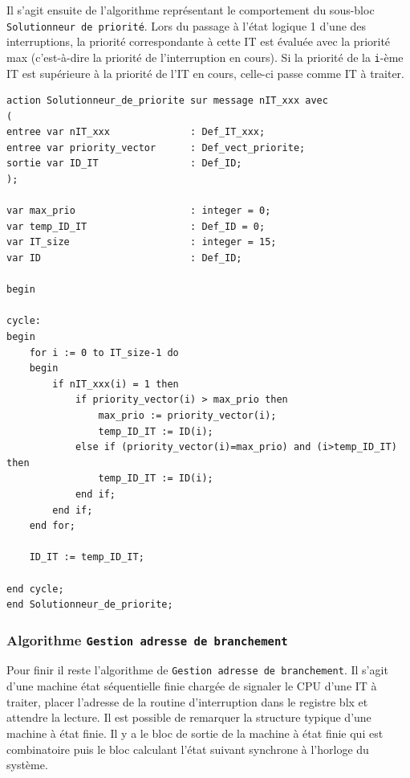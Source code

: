 Il s'agit ensuite de l'algorithme représentant le comportement du sous-bloc \texttt{Solutionneur de priorité}.
Lors du passage à l'état logique 1 d'une des interruptions, la priorité correspondante à cette IT est évaluée avec la priorité max (c'est-à-dire la priorité de l'interruption en cours).
Si la priorité de la \texttt{i}-ème IT est supérieure à la priorité de l'IT en cours, celle-ci passe comme IT à traiter.

\begin{lstlisting}[style=pascalstyle]
action Solutionneur_de_priorite sur message nIT_xxx avec
(
entree var nIT_xxx 				: Def_IT_xxx;
entree var priority_vector 		: Def_vect_priorite;
sortie var ID_IT 				: Def_ID;
);

var max_prio 					: integer = 0;
var temp_ID_IT 					: Def_ID = 0;
var IT_size 					: integer = 15;
var ID 							: Def_ID;

begin

cycle:
begin
	for i := 0 to IT_size-1 do
	begin
		if nIT_xxx(i) = 1 then
			if priority_vector(i) > max_prio then
				max_prio := priority_vector(i);
				temp_ID_IT := ID(i);
			else if (priority_vector(i)=max_prio) and (i>temp_ID_IT) then
				temp_ID_IT := ID(i);
			end if;	
		end if;
	end for;

	ID_IT := temp_ID_IT;

end cycle;
end Solutionneur_de_priorite;
\end{lstlisting}

\newpage

\subsubsection{Algorithme \texttt{Gestion adresse de branchement}}

Pour finir il reste l'algorithme de \texttt{Gestion adresse de branchement}.
Il s'agit d'une machine état séquentielle finie chargée de signaler le CPU d'une IT à traiter, placer l'adresse de la routine d'interruption dans le registre blx et attendre la lecture.
Il est possible de remarquer la structure typique d'une machine à état finie.
Il y a le bloc de sortie de la machine à état finie qui est combinatoire puis le bloc calculant l'état suivant synchrone à l'horloge du système.   



